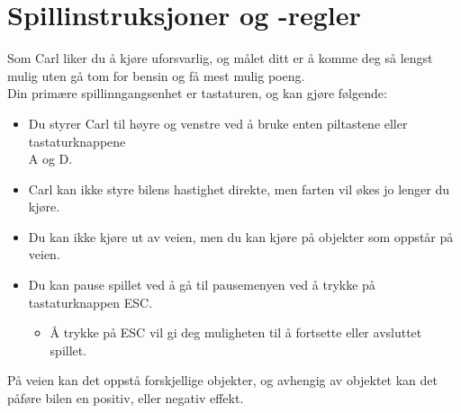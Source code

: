 \documentclass[paper=a4]{article}
\begin{document}
\section{Spillinstruksjoner og -regler} 
Som Carl liker du å kjøre uforsvarlig, og målet ditt er å komme deg så lengst mulig uten gå tom for bensin og få mest mulig poeng. \\
Din primære spillinngangsenhet er tastaturen, og kan gjøre følgende: 
\begin{itemize}
	\item Du styrer Carl til høyre og venstre ved å bruke enten piltastene eller tastaturknappene \\ A og D. \\ 
	\item Carl kan ikke styre bilens hastighet direkte, men farten vil økes jo lenger du kjøre.
	\item Du kan ikke kjøre ut av veien, men du kan kjøre på objekter som oppstår på veien.
	\item Du kan pause spillet ved å gå til pausemenyen ved å trykke på tastaturknappen ESC. 
	\begin{itemize}
		\item Å trykke på ESC vil gi deg muligheten til å fortsette eller avsluttet spillet.
	\end{itemize}
\end{itemize}
På veien kan det oppstå forskjellige objekter, og avhengig av objektet kan det påføre bilen en positiv, eller negativ effekt. \\
\end{document}
